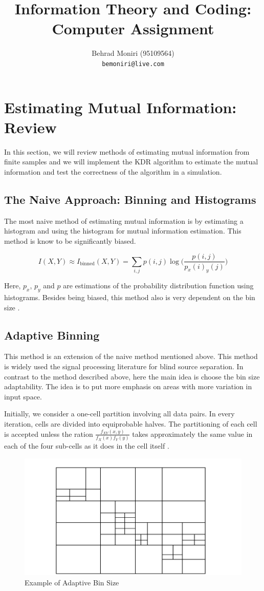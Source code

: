 \documentclass{article}
\title{Information Theory and Coding: Computer Assignment}
\author{Behrad Moniri (95109564)\\\texttt{bemoniri@live.com}}
\date{}
\begin{document}
	\maketitle
	\section{Estimating Mutual Information: Review}
	
	In this section, we will review  methods of estimating mutual information from finite samples and we will implement the KDR algorithm to estimate the mutual information and test the correctness of the algorithm in a simulation.
	\subsection{The Naive Approach: Binning and Histograms}
	The most naive method of estimating mutual information is by estimating a histogram and using the histogram for mutual information estimation. This method is know to be significantly biased.
	
	$$I(X, Y) \approx I_{\mathrm{binned}}(X, Y) = \sum_{i, j}^{} p(i, j) \log\Big(\frac{p(i, j)}{p_x(i) _y(j)}\Big)$$
	
	Here, $p_x$, $p_y$ and $p$ are estimations of the probability distribution function using histograms. Besides being biased, this method also is very dependent on the bin size \cite{cellucci2005statistical, wang2009universal}.
	
	\subsection{Adaptive Binning}
	This method is an extension of the naive method mentioned above. This method is widely used the signal processing literature for blind source separation. In contrast to the method described above, here the main idea is choose the bin size adaptability. The idea is to put more emphasis on areas with more variation in input space.

	Initially, we consider a one-cell partition involving all data pairs. In every iteration, cells are divided into equiprobable halves. The partitioning of each cell is accepted unless the ration $\frac{f_{XY}(x, y)}{f_X(x)f_Y(y)}$ takes approximately the same value in each of the four sub-cells as it does in the cell itself \cite{petr}.
	\begin{figure}[h!]
		\centering
		\includegraphics[scale = 0.35]{adaptive.png}
		\caption{Example of Adaptive Bin Size}
	\end{figure}
\end{document}
